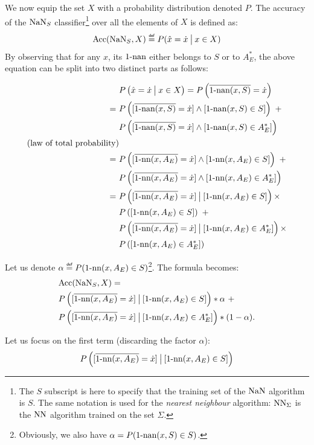 {We now equip the set $X$ with a probability distribution denoted $P$.  The
accuracy of the $\NaN_S$ classifier\footnote{The $S$ subscript is here to
  specify that the training set of the $\NaN$ algorithm is $S$. The same
  notation is used for the \textit{nearest neighbour} algorithm: $\NN_\Sigma$ is the
  $\NN$ algorithm trained on the set $\Sigma$.} over all the elements of $X$ is
  defined as: $$\acc(\NaN_S, X)\eqdef P(\hat{x}=\dot{x} \given[\big] x \in X)$$ By
  observing that for any $x$, its $\nan$ either belongs to $S$ or to $A_E^*$,
  the above equation can be split into two distinct parts as follows:

  \begin{align*}
  &P\left(\hat{x}=\dot{x} \given[\big] x \in X\right) = P\left(\albl{\nan(x,
  S)} = \dot{x}\right)\\
=~&P\left([\albl{\nan(x, S)} = \dot{x} ]\wedge [\nan(x, S) \in S
] \right)~ + \\
&P\left([\albl{\nan(x, S)} = \dot{x}] \wedge [\nan(x, S) \in A_E^*]\right)\\ \mbox{(law of total probability)}\\
=~&P\left([\albl{\nn(x, A_E)} = \dot{x}] \wedge [\nn(x, A_E) \in S ]\right)~ + \\
  &P\left([\albl{\nn(x, A_E)} = \dot{x}] \wedge [\nn(x, A_E) \in A_E^*]\right)
\\
=~&P\left([\albl{\nn(x, A_E)} = \dot{x}] \given[\big] [\nn(x, A_E) \in S
]\right) \times \\ &P\left([\nn(x, A_E) \in S]\right) ~+ \\
&P\left([\albl{\nn(x, A_E)} = \dot{x}] \given[\big] [\nn(x, A_E) \in
A_E^*]\right) \times \\ &P\left([ \nn(x, A_E) \in A_E^*]\right)
\end{align*}

Let us denote  $\alpha \eqdef P(\nn(x, A_E) \in S)$\footnote{Obviously, we
also have $\alpha = P(\nan(x, S) \in S)$.}.
The formula becomes:
\begin{align*}
  &\acc(\NaN_S, X) = \\&P\left([\albl{\nn(x, A_E)} = \dot{x}] \given[\big] [\nn(x, A_E)
\in S] \right) * \alpha ~+ \\
&P\left([\albl{\nn(x, A_E)} = \dot{x}] \given[\big] [\nn(x, A_E) \in
A_E^*]\right) * (1 -
\alpha).
\end{align*}

Let us focus on the first term  (discarding the factor $\alpha$):
$$P\left([\albl{\nn(x, A_E)} = \dot{x}] \given[\big] [\nn(x, A_E) \in S] \right)$$

}
